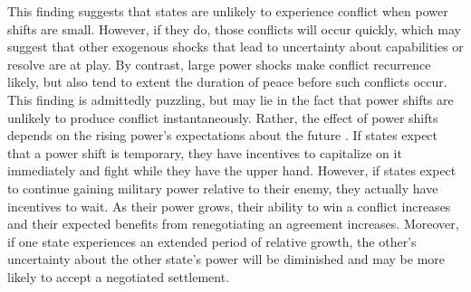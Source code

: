 This finding suggests that states are unlikely to experience conflict when power shifts are small. However, if they do, those conflicts will occur quickly, which may suggest that other exogenous shocks that lead to uncertainty about capabilities or resolve are at play. By contrast, large power shocks make conflict recurrence likely, but also tend to extent the duration of peace before such conflicts occur. This finding is admittedly puzzling, but may lie in the fact that power shifts are unlikely to produce conflict instantaneously. Rather, the effect of power shifts depends on the rising power's expectations about the future \citep{bas2017}. If states expect that a power shift is temporary, they have incentives to capitalize on it immediately and fight while they have the upper hand. However, if states expect to continue gaining military power relative to their enemy, they actually have incentives to wait. As their power grows, their ability to win a conflict increases and their expected benefits from renegotiating an agreement increases. Moreover, if one state experiences an extended period of relative growth, the other's uncertainty about the other state's power will be diminished and may be more likely to accept a negotiated settlement.


